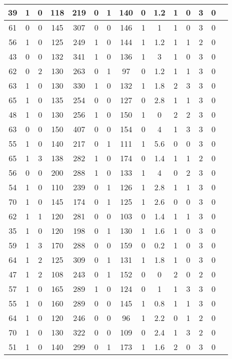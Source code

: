 \documentclass{article}
\begin{document}
\begin{longtable}{
|
c|c|c|c|c|c|c|c|c|c|c|c|c|c|c|}
\hline
39 & 1 & 0 & 118 & 219 & 0 & 1 & 140 & 0 & 1.2 & 1 & 0 & 3 & 0 \\
\hline
61 & 0 & 0 & 145 & 307 & 0 & 0 & 146 & 1 & 1 & 1 & 0 & 3 & 0 \\
\hline
56 & 1 & 0 & 125 & 249 & 1 & 0 & 144 & 1 & 1.2 & 1 & 1 & 2 & 0 \\
\hline
43 & 0 & 0 & 132 & 341 & 1 & 0 & 136 & 1 & 3 & 1 & 0 & 3 & 0 \\
\hline
62 & 0 & 2 & 130 & 263 & 0 & 1 & 97 & 0 & 1.2 & 1 & 1 & 3 & 0 \\
\hline
63 & 1 & 0 & 130 & 330 & 1 & 0 & 132 & 1 & 1.8 & 2 & 3 & 3 & 0 \\
\hline
65 & 1 & 0 & 135 & 254 & 0 & 0 & 127 & 0 & 2.8 & 1 & 1 & 3 & 0 \\
\hline
48 & 1 & 0 & 130 & 256 & 1 & 0 & 150 & 1 & 0 & 2 & 2 & 3 & 0 \\
\hline
63 & 0 & 0 & 150 & 407 & 0 & 0 & 154 & 0 & 4 & 1 & 3 & 3 & 0 \\
\hline
55 & 1 & 0 & 140 & 217 & 0 & 1 & 111 & 1 & 5.6 & 0 & 0 & 3 & 0 \\
\hline
65 & 1 & 3 & 138 & 282 & 1 & 0 & 174 & 0 & 1.4 & 1 & 1 & 2 & 0 \\
\hline
56 & 0 & 0 & 200 & 288 & 1 & 0 & 133 & 1 & 4 & 0 & 2 & 3 & 0 \\
\hline
54 & 1 & 0 & 110 & 239 & 0 & 1 & 126 & 1 & 2.8 & 1 & 1 & 3 & 0 \\
\hline
70 & 1 & 0 & 145 & 174 & 0 & 1 & 125 & 1 & 2.6 & 0 & 0 & 3 & 0 \\
\hline
62 & 1 & 1 & 120 & 281 & 0 & 0 & 103 & 0 & 1.4 & 1 & 1 & 3 & 0 \\
\hline
35 & 1 & 0 & 120 & 198 & 0 & 1 & 130 & 1 & 1.6 & 1 & 0 & 3 & 0 \\
\hline
59 & 1 & 3 & 170 & 288 & 0 & 0 & 159 & 0 & 0.2 & 1 & 0 & 3 & 0 \\
\hline
64 & 1 & 2 & 125 & 309 & 0 & 1 & 131 & 1 & 1.8 & 1 & 0 & 3 & 0 \\
\hline
47 & 1 & 2 & 108 & 243 & 0 & 1 & 152 & 0 & 0 & 2 & 0 & 2 & 0 \\
\hline
57 & 1 & 0 & 165 & 289 & 1 & 0 & 124 & 0 & 1 & 1 & 3 & 3 & 0 \\
\hline
55 & 1 & 0 & 160 & 289 & 0 & 0 & 145 & 1 & 0.8 & 1 & 1 & 3 & 0 \\
\hline
64 & 1 & 0 & 120 & 246 & 0 & 0 & 96 & 1 & 2.2 & 0 & 1 & 2 & 0 \\
\hline
70 & 1 & 0 & 130 & 322 & 0 & 0 & 109 & 0 & 2.4 & 1 & 3 & 2 & 0 \\
\hline
51 & 1 & 0 & 140 & 299 & 0 & 1 & 173 & 1 & 1.6 & 2 & 0 & 3 & 0 \\

\end{longtable}
\end{document}
